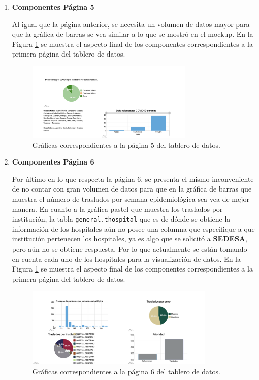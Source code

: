 \begin{enumerate}
    \newpage
    
    \item \textbf{Componentes Página 5}

    Al igual que la página anterior, se necesita un volumen de datos mayor para que la gráfica de barras se vea similar a lo que se mostró en el mockup. En la Figura \ref{fig:pag5_final} se muestra el aspecto final de los componentes correspondientes a la primera página del tablero de datos.

    \begin{figure}[h!]
        \centering
        \includegraphics[width=0.75\textwidth]{images/pag5.png}
        \caption{Gráficas correspondientes a la página 5 del tablero de datos.}
        \label{fig:pag5_final}
    \end{figure}

    \item \textbf{Componentes Página 6}

    Por último en lo que respecta  la página 6, se presenta el mismo inconveniente de no contar con gran volumen de datos para que en la gráfica de barras que muestra el número de traslados por semana epidemiológica sea vea de mejor manera. En cuanto a la gráfica pastel que muestra los traslados por institución, la tabla \texttt{general.thospital} que es de dónde se obtiene la información de los hospitales aún no posee una columna que especifique a que institución pertenecen los hospitales, ya es algo que se solicitó a \textbf{SEDESA}, pero aún no se obtiene respuesta. Por lo que actualmente se están tomando en cuenta cada uno de los hospitales para la visualización de datos. En la Figura \ref{fig:pag5_final} se muestra el aspecto final de los componentes correspondientes a la primera página del tablero de datos.

    \begin{figure}[h!]
        \centering
        \includegraphics[width=0.85\textwidth]{images/pag6.png}
        \caption{Gráficas correspondientes a la página 6 del tablero de datos.}
        \label{fig:pag6_final}
    \end{figure}
    

    
    
\end{enumerate}





